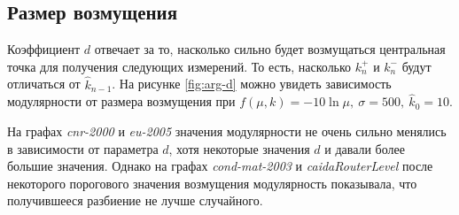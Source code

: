 
\subsection{Размер возмущения}

Коэффициент $d$ отвечает за то, насколько сильно будет возмущаться центральная точка для получения следующих измерений. То есть, насколько $k_n^{+}$ и $k_n^{-}$ будут отличаться от $\hat{k}_{n - 1}$. На рисунке \ref{fig:arg-d} можно увидеть зависимость модулярности от размера возмущения при $f(\mu, k) = -10 \ln \mu,\ \sigma = 500,\ \hat{k}_0 = 10$.

На графах \emph{cnr-2000} и \emph{eu-2005} значения модулярности не очень сильно менялись в зависимости от параметра $d$, хотя некоторые значения $d$ и давали более большие значения. Однако на графах \emph{cond-mat-2003} и \emph{caidaRouterLevel} после некоторого порогового значения возмущения модулярность показывала, что получившееся разбиение не лучше случайного.

